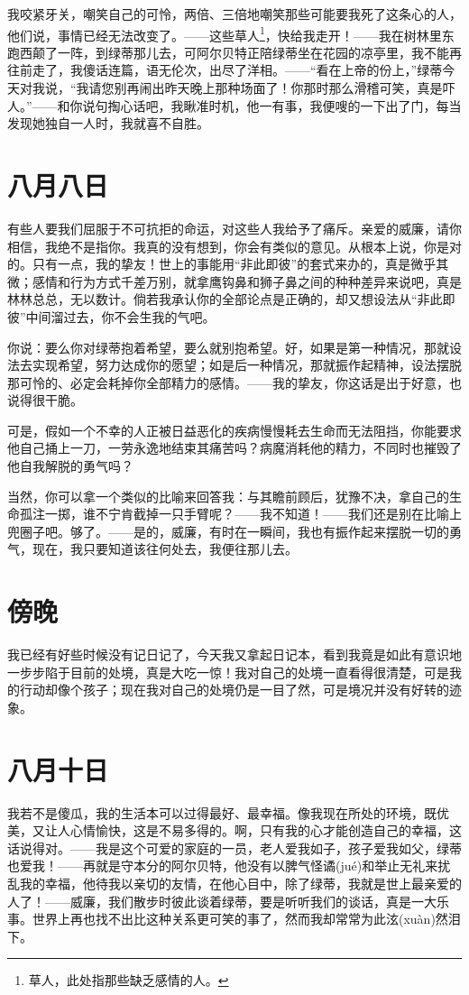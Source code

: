 \documentclass[12pt,oneside]{book}
\begin{document}
我咬紧牙关，嘲笑自己的可怜，两倍、三倍地嘲笑那些可能要我死了这条心的人，他们说，事情已经无法改变了。——这些草人\footnote{草人，此处指那些缺乏感情的人。}，快给我走开！——我在树林里东跑西颠了一阵，到绿蒂那儿去，可阿尔贝特正陪绿蒂坐在花园的凉亭里，我不能再往前走了，我傻话连篇，语无伦次，出尽了洋相。——“看在上帝的份上，”绿蒂今天对我说，“我请您别再闹出昨天晚上那种场面了！你那时那么滑稽可笑，真是吓人。”——和你说句掏心话吧，我瞅准时机，他一有事，我便嗖的一下出了门，每当发现她独自一人时，我就喜不自胜。


\chapter{八月八日}
\label{sec-2-29}
有些人要我们屈服于不可抗拒的命运，对这些人我给予了痛斥。亲爱的威廉，请你相信，我绝不是指你。我真的没有想到，你会有类似的意见。从根本上说，你是对的。只有一点，我的挚友！世上的事能用“非此即彼”的套式来办的，真是微乎其微；感情和行为方式千差万别，就拿鹰钩鼻和狮子鼻之间的种种差异来说吧，真是林林总总，无以数计。倘若我承认你的全部论点是正确的，却又想设法从“非此即彼”中间溜过去，你不会生我的气吧。

你说：要么你对绿蒂抱着希望，要么就别抱希望。好，如果是第一种情况，那就设法去实现希望，努力达成你的愿望；如是后一种情况，那就振作起精神，设法摆脱那可怜的、必定会耗掉你全部精力的感情。——我的挚友，你这话是出于好意，也说得很干脆。

可是，假如一个不幸的人正被日益恶化的疾病慢慢耗去生命而无法阻挡，你能要求他自己捅上一刀，一劳永逸地结束其痛苦吗？病魔消耗他的精力，不同时也摧毁了他自我解脱的勇气吗？

当然，你可以拿一个类似的比喻来回答我：与其瞻前顾后，犹豫不决，拿自己的生命孤注一掷，谁不宁肯截掉一只手臂呢？——我不知道！——我们还是别在比喻上兜圈子吧。够了。——是的，威廉，有时在一瞬间，我也有振作起来摆脱一切的勇气，现在，我只要知道该往何处去，我便往那儿去。


\chapter{傍晚}
\label{sec-2-30}
我已经有好些时候没有记日记了，今天我又拿起日记本，看到我竟是如此有意识地一步步陷于目前的处境，真是大吃一惊！我对自己的处境一直看得很清楚，可是我的行动却像个孩子；现在我对自己的处境仍是一目了然，可是境况并没有好转的迹象。
　　

\chapter{八月十日}
\label{sec-2-31}
我若不是傻瓜，我的生活本可以过得最好、最幸福。像我现在所处的环境，既优美，又让人心情愉快，这是不易多得的。啊，只有我的心才能创造自己的幸福，这话说得对。——我是这个可爱的家庭的一员，老人爱我如子，孩子爱我如父，绿蒂也爱我！——再就是守本分的阿尔贝特，他没有以脾气怪谲(jué)和举止无礼来扰乱我的幸福，他待我以亲切的友情，在他心目中，除了绿蒂，我就是世上最亲爱的人了！——威廉，我们散步时彼此谈着绿蒂，要是听听我们的谈话，真是一大乐事。世界上再也找不出比这种关系更可笑的事了，然而我却常常为此泫(xuàn)然泪下。
\end{document}
